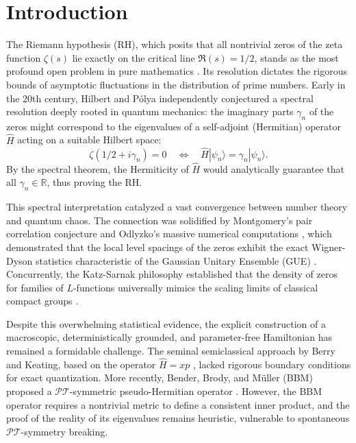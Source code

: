 \documentclass[aps,prl,preprint,superscriptaddress,floatfix]{revtex4-2}
\begin{document}
\maketitle

\section{Introduction}

The Riemann hypothesis (RH), which posits that all nontrivial zeros of the zeta function $\zeta(s)$ lie exactly on the critical line $\Re(s) = 1/2$, stands as the most profound open problem in pure mathematics \cite{Riemann1859}. Its resolution dictates the rigorous bounds of asymptotic fluctuations in the distribution of prime numbers. Early in the 20th century, Hilbert and P\'olya independently conjectured a spectral resolution deeply rooted in quantum mechanics: the imaginary parts $\gamma_n$ of the zeros might correspond to the eigenvalues of a self-adjoint (Hermitian) operator $\hat{H}$ acting on a suitable Hilbert space:
\begin{equation}
\zeta(1/2 + i\gamma_n) = 0 \quad \Longleftrightarrow \quad \hat{H}|\psi_n\rangle = \gamma_n |\psi_n\rangle.
\end{equation}
By the spectral theorem, the Hermiticity of $\hat{H}$ would analytically guarantee that all $\gamma_n \in \mathbb{R}$, thus proving the RH.

This spectral interpretation catalyzed a vast convergence between number theory and quantum chaos. The connection was solidified by Montgomery's pair correlation conjecture \cite{Montgomery1973} and Odlyzko's massive numerical computations \cite{Odlyzko2001}, which demonstrated that the local level spacings of the zeros exhibit the exact Wigner-Dyson statistics characteristic of the Gaussian Unitary Ensemble (GUE) \cite{Bohigas1984}. Concurrently, the Katz-Sarnak philosophy established that the density of zeros for families of $L$-functions universally mimics the scaling limits of classical compact groups \cite{KatzSarnak1999}.

Despite this overwhelming statistical evidence, the explicit construction of a macroscopic, deterministically grounded, and parameter-free Hamiltonian has remained a formidable challenge. The seminal semiclassical approach by Berry and Keating, based on the operator $\hat{H} = xp$ \cite{BerryKeating1999}, lacked rigorous boundary conditions for exact quantization. More recently, Bender, Brody, and M\"uller (BBM) proposed a $\mathcal{PT}$-symmetric pseudo-Hermitian operator \cite{Bender2017}. However, the BBM operator requires a nontrivial metric to define a consistent inner product, and the proof of the reality of its eigenvalues remains heuristic, vulnerable to spontaneous $\mathcal{PT}$-symmetry breaking.
\end{document}
